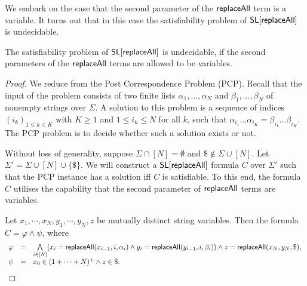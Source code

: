 We embark on the case that the second parameter of the $\mathsf{replaceAll}$ term is a variable. It turns out that in this case the satisfiability problem of $\mathsf{SL}[\mathsf{replaceAll}]$ is undecidable.

\begin{proposition}\label{prop-und-pat-var}
The satisfiability problem of $\mathsf{SL}[\mathsf{replaceAll}]$ is undecidable, if the second parameters of the $\mathsf{replaceAll}$ terms are allowed to be variables.
\end{proposition}

\begin{proof}
	We reduce from the Post Correspondence Problem (PCP). Recall that the input of the problem consists of two finite lists $\alpha_{1},\ldots ,\alpha_{N}$ and $\beta_1,\ldots ,\beta_N$ of nonempty strings over $\Sigma$. A solution to this problem is a sequence of indices $(i_{k})_{1\leq k\leq K}$ with $ K\geq 1$ and $ 1\leq i_{k}\leq N$ for all $k$, such that
$	\alpha _{{i_{1}}}\ldots \alpha _{{i_{K}}}=\beta _{{i_{1}}}\ldots \beta _{{i_{K}}}.
$
	The PCP problem is to decide whether such a solution exists or not.

	Without loss of generality, suppose $\Sigma \cap [N] = \emptyset$ and $\$ \not \in \Sigma \cup [N]$. Let $\Sigma' = \Sigma \cup [N] \cup \{\$\}$. We will construct a $\mathsf{SL}[\mathsf{replaceAll}]$ formula $C$ over $\Sigma'$ such that the PCP instance has a solution iff $C$ is satisfiable. To this end, the formula $C$ utilises the capability that the second parameter of $\mathsf{replaceAll}$ terms are variables.
	
	Let $x_1, \cdots, x_N, y_1, \cdots, y_N, z$ be mutually distinct string variables. Then the formula $C = \varphi \wedge \psi$, where 
%
$$
\begin{array}{l c l}
\varphi & = & \bigwedge \limits_{i \in [N]} (x_i = \mathsf{replaceAll}(x_{i-1}, i, \alpha_i) \wedge y_i = \mathsf{replaceAll}(y_{i-1}, i, \beta_i)) \wedge  z = \mathsf{replaceAll}(x_N, y_N, \$), \\
\psi & = & x_0 \in (1 + \cdots + N)^+ \wedge z \in \$.
\end{array}
$$


\end{proof}
